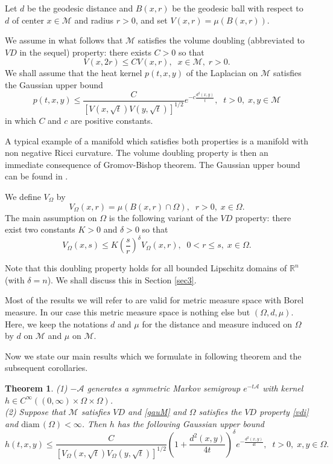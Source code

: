 \documentclass[10pt]{amsart}
\newtheorem{theorem}{Theorem}[section]
\theoremstyle{definition}
\begin{document}
\smallskip
Let $d$ be the geodesic distance and $B(x,r)$ be the geodesic ball with respect to $d$ of center $x\in \mathcal{M}$ and radius $r>0$, and set  $V(x,r)=\mu (B(x,r))$. 

\smallskip
We assume in what follows that $\mathcal{M}$ satisfies the volume doubling (abbreviated to $VD$ in the sequel) property: there exists $C>0$ so that
\[
V(x,2r)\leq CV(x,r),\;\; x\in \mathcal{M},\; r>0.
\]
We shall assume that the heat kernel $p(t,x,y)$ of the Laplacian on $\mathcal{M}$ satisfies the Gaussian upper bound
\begin{equation}\label{gauM}
p(t,x,y) \leq \frac{C}{\left[V(x,\sqrt{t})V(y,\sqrt{t})\right]^{1/2}} e^{-c\frac{d^2(x,y)}{t}},\;\; t>0,\; x,y\in \mathcal{M}
\end{equation}
in which $C$ and $c$ are positive constants. 

\smallskip
A typical example of a  manifold  which satisfies both properties is a manifold with non negative Ricci curvature. The volume doubling property is then an immediate consequence of Gromov-Bishop theorem. The Gaussian upper bound can be found in  \cite{LY}.

\smallskip
We define $V_\Omega$ by
\[
V_\Omega(x,r)=\mu \left( B(x,r)\cap \Omega \right),\;\; r>0,\; x\in \Omega .
\]
The main assumption on $\Omega$ is the following  variant of  the $VD$ property: there exist two constants $K>0$ and $\delta >0$ so that
\begin{equation}\label{vdi}
V_\Omega(x,s)\leq K\left( \frac{s}{r}\right)^\delta V_\Omega (x,r),\;\; 0<r\leq s ,\; x\in \Omega .
\end{equation}

Note that this doubling property holds for all bounded Lipschitz domains of $\mathbb{R}^n$ (with $\delta = n$). We shall discuss this in Section \ref{sec3}.

\smallskip
Most of the results we will refer to are valid for metric measure space with Borel measure. In our case this metric measure space is nothing else but $(\Omega ,d,\mu )$. Here, we keep the notations $d$ and $\mu$ for the distance and measure induced on $\Omega$ by $d$ on $\mathcal{M}$ and $\mu$ on $\mathcal{M}$.

\smallskip
Now we state our main results  which we formulate in  following theorem and the subsequent corollaries. 

\begin{theorem}\label{pthm}
(1) $-\mathcal{A}$ generates a symmetric Markov semigroup $e^{-t\mathcal{A}}$ with kernel $h\in C^\infty ((0,\infty )\times \Omega \times \Omega )$.
\\
(2) Suppose that $\mathcal{M}$  satisfies $VD$ and \eqref{gauM} and $\Omega$ satisfies the $VD$ property \eqref{vdi} and $\textrm{diam}\, (\Omega )<\infty$. Then  $h$ has the following Gaussian upper bound
\[
h(t,x,y)\leq \frac{C}{\left[V_\Omega(x,\sqrt{t})V_\Omega (y,\sqrt{t})\right]^{1/2}}\left( 1+\frac{d^2(x,y)}{4t}\right)^{\delta}e^{-\frac{d^2(x,y)}{4t}},\;\; t>0,\; x,y\in \Omega .
\]
\end{theorem}
\end{document}
